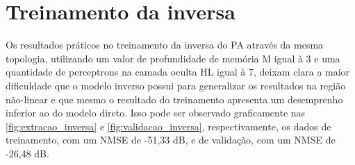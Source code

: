 \section{Treinamento da inversa} \label{sec:estudoi-inv}
Os resultados práticos no treinamento da inversa do PA através da mesma topologia, utilizando um valor de profundidade de memória M igual à 3 e uma quantidade de perceptrons na camada oculta HL igual à 7, deixam clara a maior dificuldade que o modelo inverso possui para generalizar os resultados na região não-linear e que mesmo o resultado do treinamento apresenta um desemprenho inferior ao do modelo direto. Isso pode ser observado graficamente nas \autoref{fig:extracao_inversa} e \autoref{fig:validacao_inversa}, respectivamente, os dados de treinamento, com um NMSE de -51,33 dB, e de validação, com um NMSE de -26,48 dB.


